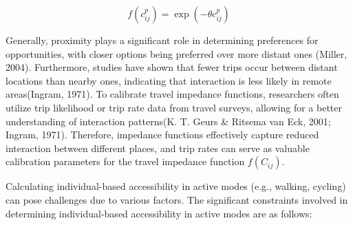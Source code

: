\documentclass[
11pt, %
oneside, %
english, %
singlespacing, %
]{macthesis} %
\begin{document}
\begin{equation}
f(c^p_{ij}) = \exp(-\theta c^p_{ij})
\label{eq:exponential-distance-decay}
\end{equation}

Generally, proximity plays a significant role in determining preferences for opportunities, with closer options being preferred over more distant ones (Miller, 2004). Furthermore, studies have shown that fewer trips occur between distant locations than nearby ones, indicating that interaction is less likely in remote areas(Ingram, 1971). To calibrate travel impedance functions, researchers often utilize trip likelihood or trip rate data from travel surveys, allowing for a better understanding of interaction patterns(K. T. Geurs \& Ritsema van Eck, 2001; Ingram, 1971). Therefore, impedance functions effectively capture reduced interaction between different places, and trip rates can serve as valuable calibration parameters for the travel impedance function \(f(C_{ij})\).

Calculating individual-based accessibility in active modes (e.g., walking, cycling) can pose challenges due to various factors. The significant constraints involved in determining individual-based accessibility in active modes are as follows:
\end{document}
